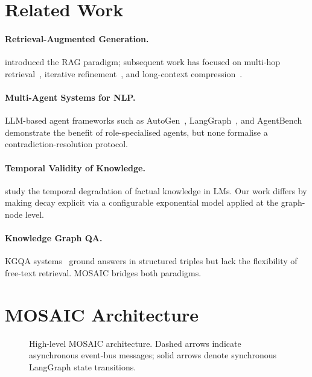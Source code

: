 \documentclass{article}
\begin{document}
\section{Related Work}
\label{sec:related}

\paragraph{Retrieval-Augmented Generation.}
\citealt{lewis2020rag} introduced the RAG paradigm; subsequent work has focused
on multi-hop retrieval~\cite{TODO}, iterative refinement~\cite{TODO}, and
long-context compression~\cite{TODO}.

\paragraph{Multi-Agent Systems for NLP.}
LLM-based agent frameworks such as AutoGen~\cite{TODO}, LangGraph~\cite{TODO},
and AgentBench~\cite{TODO} demonstrate the benefit of role-specialised agents,
but none formalise a contradiction-resolution protocol.

\paragraph{Temporal Validity of Knowledge.}
\citealt{TODO} study the temporal degradation of factual knowledge in LMs.
Our work differs by making decay explicit via a configurable exponential model
applied at the graph-node level.

\paragraph{Knowledge Graph QA.}
KGQA systems~\cite{TODO} ground answers in structured triples but lack the
flexibility of free-text retrieval.  MOSAIC bridges both paradigms.



\section{MOSAIC Architecture}
\label{sec:architecture}

\begin{figure}[ht]
  \centering
  \caption{High-level MOSAIC architecture.  Dashed arrows indicate asynchronous
    event-bus messages; solid arrows denote synchronous LangGraph state transitions.}
  \label{fig:architecture}
\end{figure}
\end{document}
